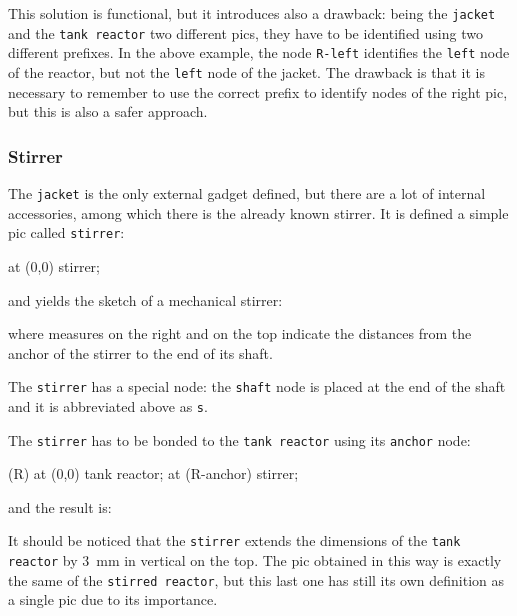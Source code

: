 \documentclass[12pt]{article}						%
\newcommand*{\chpn}[1]{\texttt{#1}}				%
\newcommand*{\chpp}[1]{\texttt{#1}}				%
\begin{document}
This solution is functional, but it introduces also a drawback: being the
\chpp{jacket} and the \chpp{tank reactor} two different pics, they have to be
identified using two different prefixes. In the above example, the node
\chpn{R-left} identifies the \chpn{left} node of the reactor, but not the
\chpn{left} node of the jacket. The drawback is that it is necessary to remember
to use the correct prefix to identify nodes of the right pic, but this is also
a safer approach.

\subsubsection{Stirrer}

The \chpp{jacket} is the only external gadget defined, but there are a lot of
internal accessories, among which there is the already known stirrer. It is
defined a simple pic called \chpp{stirrer}:
\begin{chpcode}
	\pic at (0,0) {stirrer};
\end{chpcode}
and yields the sketch of a mechanical stirrer:
\begin{center}
\end{center}
where measures on the right and on the top indicate the distances from the
anchor of the stirrer to the end of its shaft.

The \chpp{stirrer} has a special node: the \chpn{shaft} node is placed at the
end of the shaft and it is abbreviated above as \chpn{s}.

The \chpp{stirrer} has to be bonded to the \chpp{tank reactor} using its
\chpn{anchor} node:
\begin{chpcode}
	\pic (R) at (0,0) {tank reactor};
	\pic at (R-anchor) {stirrer};
\end{chpcode}
and the result is:
\begin{center}
\end{center}
It should be noticed that the \chpp{stirrer} extends the dimensions of the
\chpp{tank reactor} by \SI{3}{\mm} in vertical on the top. The pic obtained in
this way is exactly the same of the \chpp{stirred reactor}, but this last one
has still its own definition as a single pic due to its importance.
\end{document}
